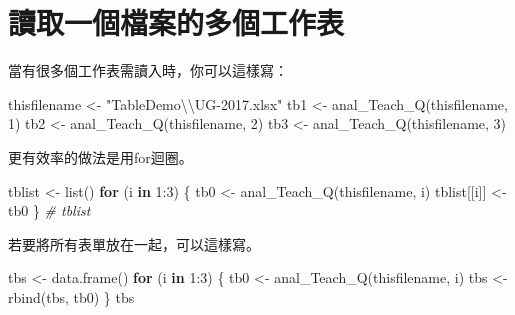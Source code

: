 \documentclass[
]{book}
\newenvironment{Shaded}{\begin{snugshade}}{\end{snugshade}}
\newcommand{\CommentTok}[1]{\textcolor[rgb]{0.56,0.35,0.01}{\textit{#1}}}
\newcommand{\ControlFlowTok}[1]{\textcolor[rgb]{0.13,0.29,0.53}{\textbf{#1}}}
\newcommand{\DecValTok}[1]{\textcolor[rgb]{0.00,0.00,0.81}{#1}}
\newcommand{\FunctionTok}[1]{\textcolor[rgb]{0.00,0.00,0.00}{#1}}
\newcommand{\NormalTok}[1]{#1}
\newcommand{\OtherTok}[1]{\textcolor[rgb]{0.56,0.35,0.01}{#1}}
\newcommand{\SpecialCharTok}[1]{\textcolor[rgb]{0.00,0.00,0.00}{#1}}
\newcommand{\StringTok}[1]{\textcolor[rgb]{0.31,0.60,0.02}{#1}}
\begin{document}
\hypertarget{ux8b80ux53d6ux4e00ux500bux6a94ux6848ux7684ux591aux500bux5de5ux4f5cux8868}{%
\section{讀取一個檔案的多個工作表}\label{ux8b80ux53d6ux4e00ux500bux6a94ux6848ux7684ux591aux500bux5de5ux4f5cux8868}}

當有很多個工作表需讀入時，你可以這樣寫：

\begin{Shaded}
\begin{Highlighting}[]
\NormalTok{thisfilename }\OtherTok{\textless{}{-}} \StringTok{"TableDemo}\SpecialCharTok{\textbackslash{}\textbackslash{}}\StringTok{UG{-}2017.xlsx"}
\NormalTok{tb1 }\OtherTok{\textless{}{-}} \FunctionTok{anal\_Teach\_Q}\NormalTok{(thisfilename, }\DecValTok{1}\NormalTok{)}
\NormalTok{tb2 }\OtherTok{\textless{}{-}} \FunctionTok{anal\_Teach\_Q}\NormalTok{(thisfilename, }\DecValTok{2}\NormalTok{)}
\NormalTok{tb3 }\OtherTok{\textless{}{-}} \FunctionTok{anal\_Teach\_Q}\NormalTok{(thisfilename, }\DecValTok{3}\NormalTok{)}
\end{Highlighting}
\end{Shaded}

更有效率的做法是用for迴圈。

\begin{Shaded}
\begin{Highlighting}[]
\NormalTok{tblist }\OtherTok{\textless{}{-}} \FunctionTok{list}\NormalTok{()}
\ControlFlowTok{for}\NormalTok{ (i }\ControlFlowTok{in} \DecValTok{1}\SpecialCharTok{:}\DecValTok{3}\NormalTok{) \{}
\NormalTok{  tb0 }\OtherTok{\textless{}{-}} \FunctionTok{anal\_Teach\_Q}\NormalTok{(thisfilename, i)  }
\NormalTok{  tblist[[i]] }\OtherTok{\textless{}{-}}\NormalTok{ tb0}
\NormalTok{\}}
\CommentTok{\# tblist}
\end{Highlighting}
\end{Shaded}

若要將所有表單放在一起，可以這樣寫。

\begin{Shaded}
\begin{Highlighting}[]
\NormalTok{tbs }\OtherTok{\textless{}{-}} \FunctionTok{data.frame}\NormalTok{()}
\ControlFlowTok{for}\NormalTok{ (i }\ControlFlowTok{in} \DecValTok{1}\SpecialCharTok{:}\DecValTok{3}\NormalTok{) \{}
\NormalTok{  tb0 }\OtherTok{\textless{}{-}} \FunctionTok{anal\_Teach\_Q}\NormalTok{(thisfilename, i)  }
\NormalTok{  tbs }\OtherTok{\textless{}{-}} \FunctionTok{rbind}\NormalTok{(tbs, tb0)}
\NormalTok{\}}
\NormalTok{tbs}
\end{Highlighting}
\end{Shaded}
\end{document}
